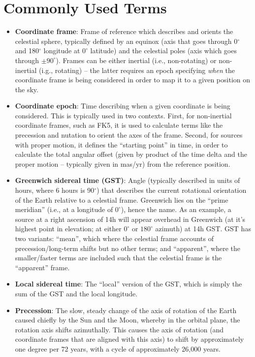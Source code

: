 \documentclass[11pt, oneside]{article}
\begin{document}
\section{Commonly Used Terms}\label{appx:glossary}
\begin{itemize}
    \item\textbf{Coordinate frame}: Frame of reference which describes and orients the celestial sphere, typically defined by an equinox (axis that goes through 0$^{\circ}$ and 180$^{\circ}$ longitude at $0^{\circ}$ latitude) and the celestial poles (axis which goes through $\pm90^{\circ}$). Frames can be either inertial (i.e., non-rotating) or non-inertial (i.g., rotating) -- the latter requires an epoch specifying \emph{when} the coordinate frame is being considered in order to map it to a given position on the sky.
    \item\textbf{Coordinate epoch}: Time describing when a given coordinate is being considered. This is typically used in two contexts. First, for non-inertial coordinate frames, such as FK5, it is used to calculate terms like the precession and nutation to orient the axes of the frame. Second, for sources with proper motion, it defines the ``starting point'' in time, in order to calculate the total angular offset (given by product of the time delta and the proper motion -- typically given in mas/yr) from the reference position.
    \item\textbf{Greenwich sidereal time (GST)}: Angle (typically described in units of hours, where 6 hours is 90$^{\circ}$) that describes the current rotational orientation of the Earth relative to a celestial frame. Greenwich lies on the ``prime meridian'' (i.e., at a longitude of $0^{\circ}$), hence the name. As an example, a source at a right ascension of 14h will appear overhead in Greenwich (at it's highest point in elevation; at either $0^{\circ}$ or $180^{\circ}$ azimuth) at 14h GST. GST has two variants: ``mean'', which where the celestial frame accounts of precession/long-term shifts but no other terms; and ``apparent'', where the smaller/faster terms are included such that the celestial frame is the ``apparent'' frame.
    \item\textbf{Local sidereal time}: The ``local'' version of the GST, which is simply the sum of the GST and the local longitude. 
    \item\textbf{Precession}: The slow, steady change of the axis of rotation of the Earth caused chiefly by the Sun and the Moon, whereby in the orbital plane, the rotation axis shifts azimuthally. This causes the axis of rotation (and coordinate frames that are aligned with this axis) to shift by approximately one degree per 72 years, with a cycle of approximately 26,000 years.

\end{itemize}
\end{document}
